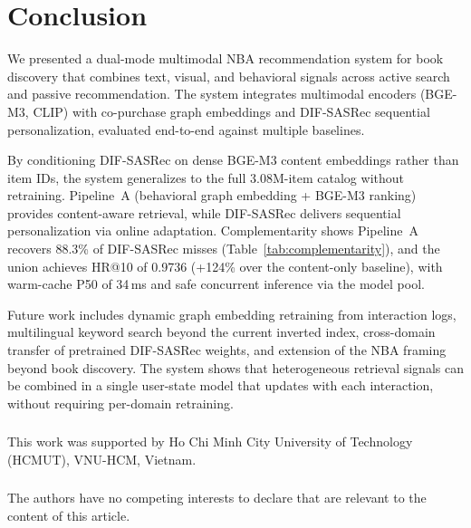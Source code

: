 \section{Conclusion}
\label{sec:conclusion}

We presented a dual-mode multimodal NBA recommendation system for book
discovery that combines text, visual, and behavioral signals across active
search and passive recommendation.
The system integrates multimodal encoders (BGE-M3, CLIP) with co-purchase
graph embeddings and DIF-SASRec sequential personalization, evaluated
end-to-end against multiple baselines.

By conditioning DIF-SASRec on dense BGE-M3 content embeddings rather than
item IDs, the system generalizes to the full 3.08M-item catalog without
retraining.
Pipeline~A (behavioral graph embedding + BGE-M3 ranking) provides
content-aware retrieval, while DIF-SASRec delivers sequential
personalization via online adaptation.
Complementarity shows Pipeline~A recovers 88.3\% of DIF-SASRec
misses (Table~\ref{tab:complementarity}), and the union achieves HR@10 of 0.9736
(+124\% over the content-only baseline), with warm-cache P50 of 34\,ms
and safe concurrent inference via the model pool.

Future work includes dynamic graph embedding retraining from interaction
logs, multilingual keyword search beyond the current inverted index,
cross-domain transfer of pretrained DIF-SASRec weights, and extension of
the NBA framing beyond book discovery.
The system shows that heterogeneous retrieval signals can be combined in a
single user-state model that updates with each interaction, without
requiring per-domain retraining.

\begin{credits}
\subsubsection{\ackname}
This work was supported by Ho Chi Minh City University of Technology (HCMUT), VNU-HCM, Vietnam.

\subsubsection{\discintname}
The authors have no competing interests to declare that are relevant to the content of this article.
\end{credits}

